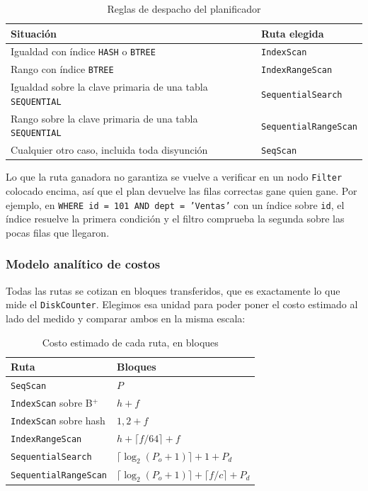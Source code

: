 \documentclass[a4paper,12pt]{article}
\begin{document}
\begin{table}[H]
\centering
\caption{Reglas de despacho del planificador}
\begin{tabularx}{\textwidth}{@{}lX@{}}
\toprule
\textbf{Situación} & \textbf{Ruta elegida} \\
\midrule
Igualdad con índice \texttt{HASH} o \texttt{BTREE} & \texttt{IndexScan} \\
Rango con índice \texttt{BTREE} & \texttt{IndexRangeScan} \\
Igualdad sobre la clave primaria de una tabla \texttt{SEQUENTIAL} & \texttt{SequentialSearch} \\
Rango sobre la clave primaria de una tabla \texttt{SEQUENTIAL} & \texttt{SequentialRangeScan} \\
Cualquier otro caso, incluida toda disyunción & \texttt{SeqScan} \\
\bottomrule
\end{tabularx}
\end{table}

Lo que la ruta ganadora no garantiza se vuelve a verificar en un nodo
\texttt{Filter} colocado encima, así que el plan devuelve las filas correctas
gane quien gane. Por ejemplo, en \texttt{WHERE id = 101 AND dept = 'Ventas'} con
un índice sobre \texttt{id}, el índice resuelve la primera condición y el filtro
comprueba la segunda sobre las pocas filas que llegaron.

\subsubsection{Modelo analítico de costos}

Todas las rutas se cotizan en bloques transferidos, que es exactamente lo que
mide el \texttt{DiskCounter}. Elegimos esa unidad para poder poner el costo
estimado al lado del medido y comparar ambos en la misma escala:

\begin{table}[H]
\centering
\caption{Costo estimado de cada ruta, en bloques}
\begin{tabular}{@{}ll@{}}
\toprule
\textbf{Ruta} & \textbf{Bloques} \\
\midrule
\texttt{SeqScan} & $P$ \\
\texttt{IndexScan} sobre B$^+$ & $h + f$ \\
\texttt{IndexScan} sobre hash & $1{,}2 + f$ \\
\texttt{IndexRangeScan} & $h + \lceil f / 64 \rceil + f$ \\
\texttt{SequentialSearch} & $\lceil \log_2 (P_o + 1) \rceil + 1 + P_d$ \\
\texttt{SequentialRangeScan} & $\lceil \log_2 (P_o + 1) \rceil + \lceil f / c \rceil + P_d$ \\
\bottomrule
\end{tabular}
\end{table}
\end{document}
